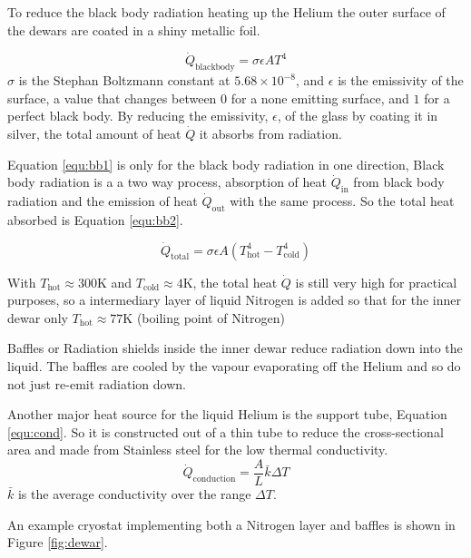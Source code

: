 To reduce the black body radiation heating up the Helium
the outer surface of the dewars are coated in a shiny metallic foil.

\begin{equation}
\dot{Q}_\text{blackbody} = \sigma \epsilon A T^4 \label{equ:bb1}
\end{equation}
$\sigma$ is the Stephan Boltzmann constant at $5.68 \times 10^{-8}$,
and $\epsilon$ is the emissivity of the surface, a value that changes between
$0$ for a none emitting surface, and $1$ for a perfect black body.
By reducing the emissivity, $\epsilon$, of the glass by coating it in silver,
the total amount of heat $\dot{Q}$ it absorbs from radiation.

Equation \ref{equ:bb1} is only for the black body radiation in one direction,
Black body radiation is a a two way process, absorption of heat $\dot{Q}_\text{in}$
from black body radiation and the emission of heat $\dot{Q}_\text{out}$
with the same process. So the total heat absorbed is Equation \ref{equ:bb2}.

\begin{equation}
\dot{Q}_\text{total} = \sigma \epsilon A \left( T_{\text{hot}}^4 - T_\text{cold}^4 \right) \label{equ:bb2}
\end{equation}

With $T_{\text{hot}} \approx 300$K and $T_{\text{cold}} \approx 4$K, the total heat $\dot{Q}$ is
still very high for practical purposes, so a intermediary layer of liquid Nitrogen is added so that for the
inner dewar only $T_{\text{hot}} \approx 77$K (boiling point of Nitrogen)

Baffles or Radiation shields inside the inner dewar reduce radiation down into 
the liquid. The baffles are cooled by the vapour evaporating off the Helium and
so do not just re-emit radiation down.

Another major heat source for the liquid Helium is the support tube, Equation \ref{equ:cond}. So it
is constructed out of a thin tube to reduce the cross-sectional area and
made from Stainless steel for the low thermal conductivity.
\begin{equation}
\dot{Q}_\text{conduction} = \frac{A}{L} \bar{k} \Delta T \label{equ:cond}
\end{equation}
$\bar{k}$ is the average conductivity over the range $\Delta T$.

An example cryostat implementing both a Nitrogen layer and baffles is shown in Figure \ref{fig:dewar}.

